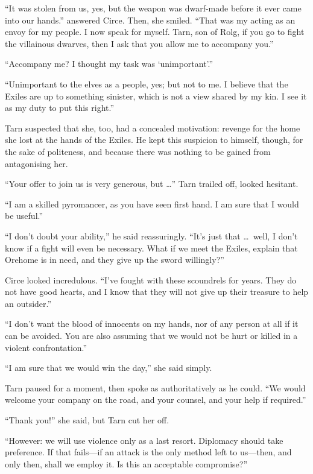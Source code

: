 ``It was stolen from us, yes, but the weapon was dwarf-made before it ever came into our hands.'' answered Circe.  Then, she smiled.  ``That was my acting as an envoy for my people.  I now speak for myself.  Tarn, son of Rolg, if you go to fight the villainous dwarves, then I ask that you allow me to accompany you.''

``Accompany me?  I thought my task was `unimportant'.''

``Unimportant to the elves as a people, yes; but not to me.  I believe that the Exiles are up to something sinister, which is not a view shared by my kin.  I see it as my duty to put this right.''

Tarn suspected that she, too, had a concealed motivation: revenge for the home she lost at the hands of the Exiles.  He kept this suspicion to himself, though, for the sake of politeness, and because there was nothing to be gained from antagonising her.

``Your offer to join us is very generous, but \ldots'' Tarn trailed off, looked hesitant.

``I am a skilled pyromancer, as you have seen first hand.  I am sure that I would be useful.''

``I don't doubt your ability,'' he said reassuringly.  ``It's just that \ldots\ well, I don't know if a fight will even be necessary.  What if we meet the Exiles, explain that Orehome is in need, and they give up the sword willingly?''

Circe looked incredulous.  ``I've fought with these scoundrels for years.  They do not have good hearts, and I know that they will not give up their treasure to help an outsider.''

``I don't want the blood of innocents on my hands, nor of any person at all if it can be avoided.  You are also assuming that we would not be hurt or killed in a violent confrontation.''

``I am sure that we would win the day,'' she said simply.

Tarn paused for a moment, then spoke as authoritatively as he could.  ``We would welcome your company on the road, and your counsel, and your help if required.''

``Thank you!'' she said, but Tarn cut her off.

``However: we will use violence only as a last resort.  Diplomacy should take preference.  If that fails---if an attack is the only method left to us---then, and only then, shall we employ it.  Is this an acceptable compromise?''

